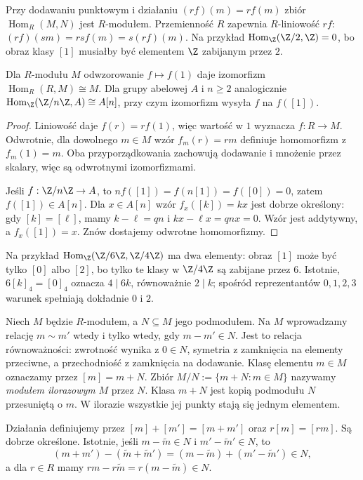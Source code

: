 Przy dodawaniu punktowym i działaniu $(rf)(m)=r f(m)$
zbiór $\operatorname{Hom}_R(M,N)$ jest $R$-modułem.
Przemienność $R$ zapewnia $R$-liniowość $rf$:
$(rf)(sm)=rsf(m)=s(rf)(m)$.
Na przykład $\operatorname{Hom}_{\Z}(\Z/2,\Z)=0$,
bo obraz klasy $[1]$ musiałby być elementem $\Z$ zabijanym przez $2$.

\begin{stwierdzenie}
\label{prop:hom-cyclic-5}
Dla $R$-modułu $M$ odwzorowanie $f\mapsto f(1)$ daje
izomorfizm $\operatorname{Hom}_R(R,M)\cong M$.
Dla grupy abelowej $A$ i $n\geq2$ analogicznie
$\operatorname{Hom}_{\Z}(\Z/n\Z,A)\cong A[n]$,
przy czym izomorfizm wysyła $f$ na $f([1])$.
\end{stwierdzenie}
\begin{proof}
Liniowość daje $f(r)=rf(1)$, więc wartość w $1$
wyznacza $f:R\to M$. Odwrotnie, dla dowolnego $m\in M$
wzór $f_m(r)=rm$ definiuje homomorfizm z $f_m(1)=m$.
Oba przyporządkowania zachowują dodawanie i mnożenie
przez skalary, więc są odwrotnymi izomorfizmami.

Jeśli $f:\Z/n\Z\to A$, to
$nf([1])=f(n[1])=f([0])=0$, zatem $f([1])\in A[n]$.
Dla $x\in A[n]$ wzór $f_x([k])=kx$ jest dobrze określony:
gdy $[k]=[\ell]$, mamy $k-\ell=qn$ i
$kx-\ell x=qn x=0$. Wzór jest addytywny,
a $f_x([1])=x$. Znów dostajemy odwrotne homomorfizmy.
\end{proof}

Na przykład $\operatorname{Hom}_{\Z}(\Z/6\Z,\Z/4\Z)$
ma dwa elementy: obraz $[1]$ może być tylko $[0]$
albo $[2]$, bo tylko te klasy w $\Z/4\Z$ są
zabijane przez $6$. Istotnie, $6[k]_4=[0]_4$ oznacza
$4\mid6k$, równoważnie $2\mid k$; spośród reprezentantów
$0,1,2,3$ warunek spełniają dokładnie $0$ i $2$.

\begin{definicja}
\label{def:modul-ilorazowy}
Niech $M$ będzie $R$-modułem, a $N\subseteq M$ jego podmodułem.
Na $M$ wprowadzamy relację $m\sim m'$ wtedy i tylko wtedy,
gdy $m-m'\in N$. Jest to relacja równoważności:
zwrotność wynika z $0\in N$, symetria z zamknięcia na
elementy przeciwne, a przechodniość z zamknięcia na dodawanie.
Klasę elementu $m\in M$ oznaczamy przez $[m]=m+N$.
Zbiór $M/N:=\{m+N:m\in M\}$ nazywamy
\emph{modułem ilorazowym} $M$ przez $N$.
Klasa $m+N$ jest kopią podmodułu $N$ przesuniętą o $m$.
W ilorazie wszystkie jej punkty stają się jednym elementem.

Działania definiujemy przez $[m]+[m']=[m+m']$ oraz
$r[m]=[rm]$. Są dobrze określone. Istotnie, jeśli
$m-\widetilde m\in N$ i $m'-\widetilde m'\in N$, to
\[
(m+m')-(\widetilde m+\widetilde m')
=
(m-\widetilde m)+(m'-\widetilde m')
\in N,
\]
a dla $r\in R$ mamy $rm-r\widetilde m=r(m-\widetilde m)\in N$.
\end{definicja}


